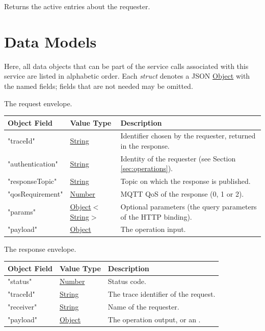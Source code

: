 \documentclass[a4paper]{arrowhead}
\newcommand{\mref}[2][]{{\textcolor{ArrowheadPurple}{\hyperref[sec:model:#2]{\ifstrempty{#1}{#2}{#1}}}}}
\newcommand{\pref}[1]{{\textcolor{ArrowheadGrey}{\hyperref[sec:model:primitives:#1]{#1}}}}
\begin{document}
Returns the active entries about the requester.

\newpage

\section{Data Models}
\label{sec:model}

Here, all data objects that can be part of the service calls associated with this service are listed in alphabetic order.
Each \textit{struct} denotes a JSON \pref{Object} with the named fields; fields that are not needed may be omitted.


The request envelope.

\noindent\begin{tabularx}{\textwidth}{| p{4.25cm} | p{3.5cm} | X |} \hline
\rowcolor{gray!33} Object Field & Value Type & Description \\ \hline
"traceId" & \pref{String} & Identifier chosen by the requester, returned in the response. \\ \hline
"authentication" & \pref{String} & Identity of the requester (see Section \ref{sec:operations}). \\ \hline
"responseTopic" & \pref{String} & Topic on which the response is published. \\ \hline
"qosRequirement" & \pref{Number} & MQTT QoS of the response (0, 1 or 2). \\ \hline
"params" & \pref{Object}$<$\pref{String}$>$ & Optional parameters (the query parameters of the HTTP binding). \\ \hline
"payload" & \pref{Object} & The operation input. \\ \hline
\end{tabularx}


The response envelope.

\noindent\begin{tabularx}{\textwidth}{| p{4.25cm} | p{3.5cm} | X |} \hline
\rowcolor{gray!33} Object Field & Value Type & Description \\ \hline
"status" & \pref{Number} & Status code. \\ \hline
"traceId" & \pref{String} & The trace identifier of the request. \\ \hline
"receiver" & \pref{String} & Name of the requester. \\ \hline
"payload" & \pref{Object} & The operation output, or an \mref{ErrorMessage}. \\ \hline
\end{tabularx}
\end{document}
